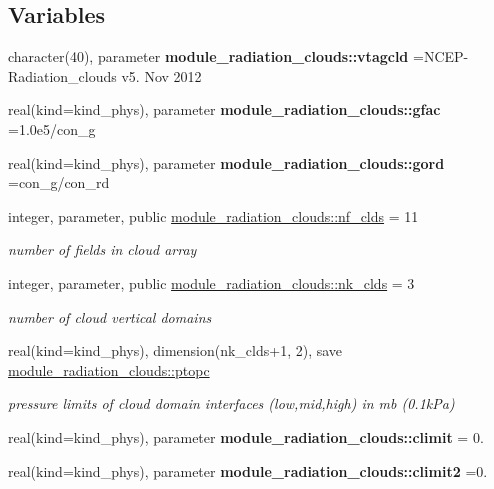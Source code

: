 \subsection*{Variables}
\begin{DoxyCompactItemize}
\item 
\mbox{\label{radiation__clouds_8f_a54f11c2f6353f244501cf4ec3553d78b}} 
character(40), parameter {\bfseries module\+\_\+radiation\+\_\+clouds\+::vtagcld} =\textquotesingle{}N\+C\+EP-\/Radiation\+\_\+clouds v5. Nov 2012 \textquotesingle{}
\item 
real(kind=kind\+\_\+phys), parameter {\bfseries module\+\_\+radiation\+\_\+clouds\+::gfac} =1.\+0e5/con\+\_\+g
\item 
real(kind=kind\+\_\+phys), parameter {\bfseries module\+\_\+radiation\+\_\+clouds\+::gord} =con\+\_\+g/con\+\_\+rd
\item 
integer, parameter, public \hyperlink{group__module__radiation__clouds_ga66cf0f94619a3d865b0c593197a30576}{module\+\_\+radiation\+\_\+clouds\+::nf\+\_\+clds} = 11
\begin{DoxyCompactList}\small\item\em number of fields in cloud array \end{DoxyCompactList}\item 
integer, parameter, public \hyperlink{group__module__radiation__clouds_ga2739168b8205ee860eb8a160ea722a44}{module\+\_\+radiation\+\_\+clouds\+::nk\+\_\+clds} = 3
\begin{DoxyCompactList}\small\item\em number of cloud vertical domains \end{DoxyCompactList}\item 
real(kind=kind\+\_\+phys), dimension(nk\+\_\+clds+1, 2), save \hyperlink{group__module__radiation__clouds_ga03bc5d19cbdc84a2032c8d591ba4c96a}{module\+\_\+radiation\+\_\+clouds\+::ptopc}
\begin{DoxyCompactList}\small\item\em pressure limits of cloud domain interfaces (low,mid,high) in mb (0.\+1k\+Pa) \end{DoxyCompactList}\item 
real(kind=kind\+\_\+phys), parameter {\bfseries module\+\_\+radiation\+\_\+clouds\+::climit} = 0.
\item 
real(kind=kind\+\_\+phys), parameter {\bfseries module\+\_\+radiation\+\_\+clouds\+::climit2} =0.
\item 

\end{DoxyCompactItemize}
